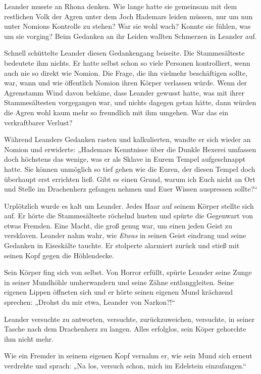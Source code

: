 Leander musste an Rhona denken. Wie lange hatte sie gemeinsam mit dem restlichen Volk der Agren unter dem Joch Hademars leiden müssen, nur um nun unter Nomions Kontrolle zu stehen? War sie wohl wach? Konnte sie fühlen, was um sie vorging? Beim Gedanken an ihr Leiden wallten Schmerzen in Leander auf.

Schnell schüttelte Leander diesen Gedankengang beiseite. Die Stammesälteste bedeutete ihm nichts. Er hatte selbst schon so viele Personen kontrolliert, wenn auch nie so direkt wie Nomion. Die Frage, die ihn vielmehr beschäftigen sollte, war, wann und wie öffentlich Nomion ihren Körper verlassen würde. Wenn der Agrenstamm Wind davon bekäme, dass Leander gewusst hatte, was mit ihrer Stammesältesten vorgegangen war, und nichts dagegen getan hätte, dann würden die Agren wohl kaum mehr so freundlich mit ihm umgehen. War das ein verkraftbarer Verlust?

Während Leanders Gedanken rasten und kalkulierten, wandte er sich wieder an Nomion und erwiderte: „Hademars Kenntnisse über die Dunkle Hexerei umfassen doch höchstens das wenige, was er als Sklave in Eurem Tempel aufgeschnappt hatte. Sie können unmöglich so tief gehen wie die Euren, der diesen Tempel doch überhaupt erst errichten ließ. Gibt es einen Grund, warum ich Euch nicht an Ort und Stelle im Drachenherz gefangen nehmen und Euer Wissen auspressen sollte?“

Urplötzlich wurde es kalt um Leander. Jedes Haar auf seinem Körper stellte sich auf. Er hörte die Stammesälteste röchelnd husten und spürte die Gegenwart von etwas Fremden. Eine Macht, die groß genug war, um einen jeden Geist zu versklaven. Leander nahm wahr, wie \textit{Etwas} in seinen Geist eindrang und seine Gedanken in Eiseskälte tauchte. Er stolperte alarmiert zurück und stieß mit seinen Kopf gegen die Höhlendecke.

Sein Körper fing sich von selbst. Von Horror erfüllt, spürte Leander seine Zunge in seiner Mundhöhle umherwandern und seine Zähne entlanggleiten. Seine eigenen Lippen öffneten sich und er hörte seinen eigenen Mund krächzend sprechen: „Drohst du mir etwa, Leander von Narkon?!“

Leander versuchte zu antworten, versuchte, zurückzuweichen, versuchte, in seiner Tasche nach dem Drachenherz zu langen. Alles erfolglos, sein Köper gehorchte ihm nicht mehr.

Wie ein Fremder in seinem eigenen Kopf vernahm er, wie sein Mund sich erneut verdrehte und sprach: „Na los, versuch schon, mich im Edelstein einzufangen.“

